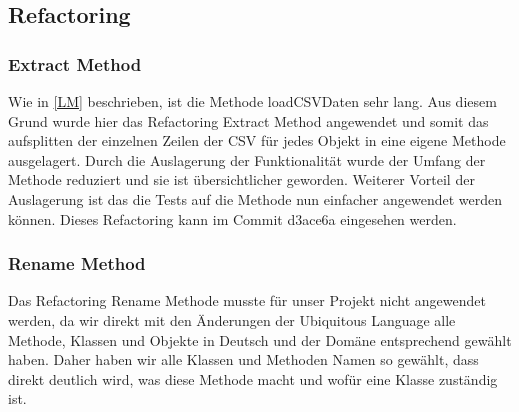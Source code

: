 \subsection{Refactoring}
\subsubsection{Extract Method}
Wie in \autoref{LM} beschrieben, ist die Methode loadCSVDaten sehr lang. Aus diesem Grund wurde hier das Refactoring Extract Method angewendet und somit das aufsplitten der einzelnen Zeilen der CSV für jedes Objekt in eine eigene Methode ausgelagert.
Durch die Auslagerung der Funktionalität wurde der Umfang der Methode reduziert und sie ist übersichtlicher geworden. 
Weiterer Vorteil der Auslagerung ist das die Tests auf die Methode nun einfacher angewendet werden können. 
Dieses Refactoring kann im Commit d3ace6a eingesehen werden.
\subsubsection{Rename Method}
Das Refactoring Rename Methode musste für unser Projekt nicht angewendet werden, da wir direkt mit den Änderungen der Ubiquitous Language alle Methode, Klassen und Objekte in Deutsch und der Domäne entsprechend gewählt haben. Daher haben wir alle Klassen und Methoden Namen so gewählt, dass direkt deutlich wird, was diese Methode macht und wofür eine Klasse zuständig ist.
\subsubsection{}